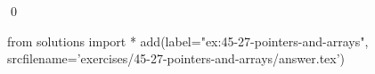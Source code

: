 
\begin{ex}
  \label{ex:45-27-pointers-and-arrays}
  
  \qed
\end{ex}
\begin{python0}
from solutions import *
add(label="ex:45-27-pointers-and-arrays",
    srcfilename='exercises/45-27-pointers-and-arrays/answer.tex')
\end{python0}
